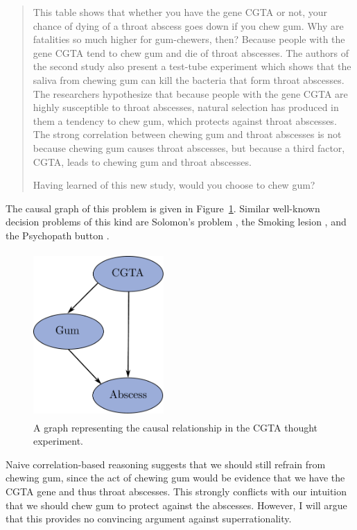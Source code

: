 \begin{quote}
This table shows that whether you have the gene CGTA or not, your chance
of dying of a throat abscess goes down if you chew gum. Why are
fatalities so much higher for gum-chewers, then? Because people with the
gene CGTA tend to chew gum and die of throat abscesses. The authors of
the second study also present a test-tube experiment which shows that
the saliva from chewing gum can kill the bacteria that form throat
abscesses. The researchers hypothesize that because people with the gene
CGTA are highly susceptible to throat abscesses, natural selection has
produced in them a tendency to chew gum, which protects against throat
abscesses. The strong correlation between chewing gum and throat
abscesses is not because chewing gum causes throat abscesses, but
because a third factor, CGTA, leads to chewing gum and throat abscesses.

Having learned of this new study, would you choose to chew gum?
\end{quote}

The causal graph of this problem is given in Figure~\ref{causal-graph-CGTA}.
Similar well-known decision problems of this kind are Solomon's problem
\parencite{Gibbard1978-nw,Eells2016-ym}, the Smoking lesion
\parencite{Eells2016-ym}, and the Psychopath button
\parencite{Egan2007-ey}.
\begin{figure}[h!]
    \centering
    \includegraphics[width=1.95625in,height=2.48452in]{figs/causal-graph-CGTA}
    \caption{A graph representing the causal relationship
in the CGTA thought experiment.}
    \label{causal-graph-CGTA}
\end{figure}
%

Naive correlation-based reasoning suggests that we should still refrain
from chewing gum, since the act of chewing gum would be evidence that we
have the CGTA gene and thus throat abscesses. This strongly conflicts
with our intuition that we should chew gum to protect against the
abscesses. However, I will argue that this provides no convincing
argument against superrationality.

